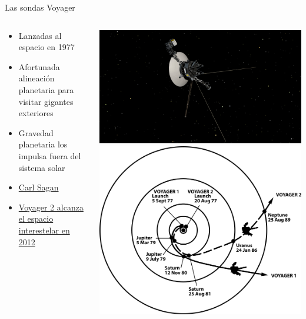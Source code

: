 \documentclass[bigger]{beamer}
\begin{document}
\begin{frame}[label={sec:orge8dbf63}]{Las sondas Voyager}
\begin{columns}
\begin{column}{0.6\columnwidth}
\begin{itemize}
\item Lanzadas al espacio en 1977
\item Afortunada alineación planetaria para visitar gigantes exteriores
\item Gravedad planetaria los impulsa fuera del sistema solar
\item \href{https://www.youtube.com/watch?v=niKWI1AFMno}{\ExternalLink Carl Sagan}
\item \href{https://www.youtube.com/watch?v=MGPM58S5Njg}{\ExternalLink Voyager 2 alcanza el espacio interestelar en 2012}
\end{itemize}
\end{column}
\begin{column}{0.4\columnwidth}
\centering
\includegraphics[width=\textwidth]{./pics/voyager1.jpg} \\[0pt]
\includegraphics[width=\textwidth]{./pics/800px-Voyager_Path.svg.png}
\end{column}
\end{columns}
\end{frame}
\end{document}
